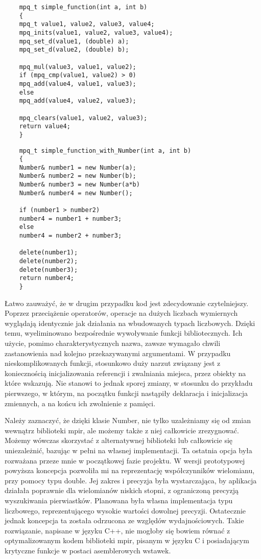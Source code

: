 \documentclass[oneside,a4paper]{book}
\begin{document}
	\begin{lstlisting}
	mpq_t simple_function(int a, int b)
	{
	mpq_t value1, value2, value3, value4;
	mpq_inits(value1, value2, value3, value4);
	mpq_set_d(value1, (double) a);
	mpq_set_d(value2, (double) b);
	
	mpq_mul(value3, value1, value2);
	if (mpq_cmp(value1, value2) > 0)
	mpq_add(value4, value1, value3);
	else
	mpq_add(value4, value2, value3);
	
	mpq_clears(value1, value2, value3);
	return value4;
	}
	\end{lstlisting}
	
	\begin{lstlisting}
	mpq_t simple_function_with_Number(int a, int b)
	{
	Number& number1 = new Number(a);
	Number& number2 = new Number(b);
	Number& number3 = new Number(a*b)
	Number& number4 = new Number();
	
	if (number1 > number2)
	number4 = number1 + number3;
	else
	number4 = number2 + number3;
	
	delete(number1);
	delete(number2);
	delete(number3);
	return number4;
	}
	\end{lstlisting}
	
	Łatwo zauważyć, że w drugim przypadku kod jest zdecydowanie czytelniejszy. Poprzez przeciążenie operatorów, operacje na dużych liczbach wymiernych wyglądają identycznie jak działania na wbudowanych typach liczbowych. Dzięki temu, wyeliminowano bezpośrednie wywoływanie funkcji bibliotecznych. Ich użycie, pomimo charakterystycznych nazwa, zawsze wymagało chwili zastanowienia nad kolejno przekazywanymi argumentami. W przypadku nieskomplikowanych funkcji, stosunkowo duży narzut związany jest z koniecznością inicjalizowania referencji i zwalniania miejsca, przez obiekty na które wskazują. Nie stanowi to jednak sporej zmiany, w stosunku do przykładu pierwszego, w którym, na początku funkcji nastąpiły deklaracja i inicjalizacja zmiennych, a na końcu ich zwolnienie z pamięci.
	
	Należy zaznaczyć, że dzięki klasie Number, nie tylko uzależniamy się od zmian wewnątrz biblioteki mpir, ale możemy także z niej całkowicie zrezygnować. Możemy wówczas skorzystać z alternatywnej biblioteki lub całkowicie się uniezależnić, bazując w pełni na własnej implementacji. Ta ostatnia opcja była rozważana przeze mnie w początkowej fazie projektu. W wersji prototypowej powyższa koncepcja pozwoliła mi na reprezentację współczynników wielomianu, przy pomocy typu double. Jej zakres i precyzja była wystarczająca, by aplikacja działała poprawnie dla wielomianów niskich stopni, z ograniczoną precyzją wyszukiwania pierwiastków. Planowana była własna implementacja typu liczbowego, reprezentującego wysokie wartości dowolnej precyzji. Ostatecznie jednak koncepcja ta została odrzucona ze względów wydajnościowych. Takie rozwiązanie, napisane w języku C++, nie mogłoby się bowiem równać z optymalizowanym kodem biblioteki mpir, pisanym w języku C i posiadającym krytyczne funkcje w postaci asemblerowych wstawek.
	
\end{document}
